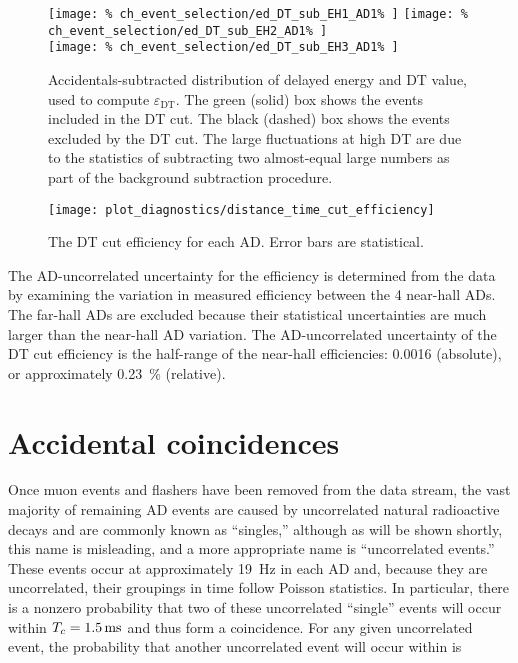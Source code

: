 \begin{figure}
    \centering
    \texttt{[image: \%
        ch\_event\_selection/ed\_DT\_sub\_EH1\_AD1\%
    ]}
    \texttt{[image: \%
        ch\_event\_selection/ed\_DT\_sub\_EH2\_AD1\%
    ]} \\
    \texttt{[image: \%
        ch\_event\_selection/ed\_DT\_sub\_EH3\_AD1\%
    ]}
    \caption{
        Accidentals-subtracted distribution of
        delayed energy and DT value, used to compute $\varepsilon_{\text{DT}}$.
        The green (solid) box shows the events included in the DT cut.
        The black (dashed) box shows the events excluded by the DT cut.
        The large fluctuations at high DT are due to the statistics
        of subtracting two almost-equal large numbers as part of the
        background subtraction procedure.
    }
    \label{fig:ed_DT_sub}
\end{figure}

\begin{figure}
    \centering
    \texttt{[image: plot\_diagnostics/distance\_time\_cut\_efficiency]}
    \caption{The DT cut efficiency for each AD. Error bars are statistical.}
    \label{fig:DT_eff}
\end{figure}

The AD-uncorrelated uncertainty for the efficiency
is determined from the data by examining the variation
in measured efficiency between the 4 near-hall ADs.
The far-hall ADs are excluded because
their statistical uncertainties are much larger than the
near-hall AD variation.
The AD-uncorrelated uncertainty of the DT cut efficiency
is the half-range of the near-hall efficiencies: \num{0.0016} (absolute),
or approximately \SI{0.23}{\percent} (relative).

\section{Accidental coincidences}
\label{sec:acc}

Once muon events and flashers have been removed from the data stream,
the vast majority of remaining AD events are caused by uncorrelated
natural radioactive decays and are commonly known as ``singles,''
although as will be shown shortly, this name is misleading,
and a more appropriate name is ``uncorrelated events.''
These events occur at approximately \SI{19}{\hertz} in each AD and,
because they are uncorrelated, their groupings in time follow Poisson statistics.
In particular, there is a nonzero probability that
two of these uncorrelated ``single'' events will occur within
$T_c=\SI{1.5}{\milli\second}$ and thus form a  coincidence.
For any given uncorrelated event, the probability that
another uncorrelated event will occur within \tc{} is

